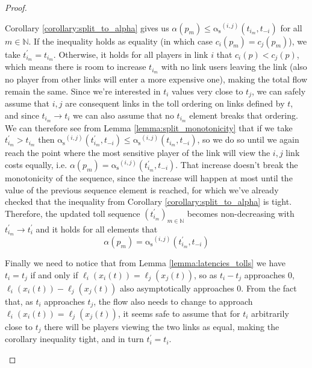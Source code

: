 \documentclass[10pt,a4paper]{book}
\newcommand{\as}{\mathrm{\alpha_s}}
\newcommand{\N}{\mathbb{N}}
\theoremstyle{definition}
\theoremstyle{comment}
\begin{document}
\begin{proof}
\begin{enumerate}[(i)]
		Corollary \ref{corollary:split_to_alpha} gives us $\alpha(p_m) \le \as^{(i, j)}(t_{i_m}, t_{-i})$ for all $m \in \N$.
		If the inequality holds as equality (in which case $c_i(p_m) = c_j(p_m)$), we take $t_{i_m}^\prime = t_{i_m}$.
		Otherwise, it holds for all players in link $i$ that $c_i(p) < c_j(p)$, which means there is room to increase $t_{i_m}$ with no link users leaving the link (also no player from other links will enter a more expensive one), making the total flow remain the same.
		Since we're interested in $t_i$ values very close to $t_j$, we can safely assume that $i, j$ are consequent links in the toll ordering on links defined by $t$, and since $t_{i_m} \rightarrow t_i$ we can also assume that no $t_{i_m}$ element breaks that ordering.
		We can therefore see from Lemma \ref{lemma:split_monotonicity} that if we take $t_{i_m}^\prime > t_{i_m}$ then $\as^{(i, j)}(t_{i_m}^\prime, t_{-i}) \le \as^{(i, j)}(t_{i_m}, t_{-i})$, so we do so until we again reach the point where the most sensitive player of the link will view the $i, j$ link costs equally, i.e. $\alpha(p_m) = \as^{(i, j)}(t_{i_m}^\prime, t_{-i})$.
		That increase doesn't break the monotonicity of the sequence, since the increase will happen at most until the value of the previous sequence element is reached, for which we've already checked that the inequality from Corollary \ref{corollary:split_to_alpha} is tight.
		Therefore, the updated toll sequence $(t_{i_m}^\prime)_{m \in \N}$ becomes non-decreasing with $t_{i_m}^\prime \rightarrow t_i^\prime$ and it holds for all elements that
		\[\alpha(p_m) = \as^{(i, j)}(t_{i_m}^\prime, t_{-i})\]

		Finally we need to notice that from Lemma \ref{lemma:latencies_tolls} we have $t_i = t_j$ if and only if $\ell_i(x_i(t)) = \ell_j(x_j(t))$, so as $t_i - t_j$ approaches $0$, $\ell_i(x_i(t)) - \ell_j(x_j(t))$ also asymptotically approaches $0$.
		From the fact that, as $t_i$ approaches $t_j$, the flow also needs to change to approach $\ell_i(x_i(t)) = \ell_j(x_j(t))$, it seems safe to assume that for $t_i$ arbitrarily close to $t_j$ there will be players viewing the two links as equal, making the corollary inequality tight, and in turn $t_i^\prime = t_i$.


\end{enumerate}
\end{proof}
\end{document}
